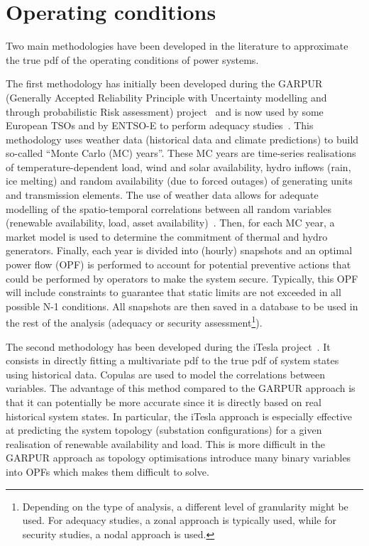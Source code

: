 \section{Operating conditions}
\label{sec:operating_conditions}

Two main methodologies have been developed in the literature to approximate the true pdf of the operating conditions of power systems.

The first methodology has initially been developed during the GARPUR (Generally Accepted Reliability Principle with Uncertainty modelling and through probabilistic Risk assessment) project~\cite{StrathElia, StrathGARPUR} and is now used by some European TSOs and by ENTSO-E to perform adequacy studies~\cite{ACER_MC_year, EliaAdequacy, ENTSOE_MC_year}. This methodology uses weather data (historical data and climate predictions) to build so-called ``Monte Carlo (MC) years''. These MC years are time-series realisations of temperature-dependent load, wind and solar availability, hydro inflows (rain, ice melting) and random availability (due to forced outages) of generating units and transmission elements. The use of weather data allows for adequate modelling of the spatio-temporal correlations between all random variables (renewable availability, load, asset availability)~\cite{StrathGARPUR, ENTSOE_MC_year}. Then, for each MC year, a market model is used to determine the commitment of thermal and hydro generators. Finally, each year is divided into (\eg hourly) snapshots and an optimal power flow (OPF) is performed to account for potential preventive actions that could be performed by operators to make the system secure. Typically, this OPF will include constraints to guarantee that static limits are not exceeded in all possible N-1 conditions. All snapshots are then saved in a database to be used in the rest of the analysis (\eg adequacy or security assessment\footnote{Depending on the type of analysis, a different level of granularity might be used. For adequacy studies, a zonal approach is typically used, while for security studies, a nodal approach is used.}).


The second methodology has been developed during the iTesla project~\cite{KonstantelosCopulas, EurostagHPC, iTesla_uncertainties}. It consists in directly fitting a multivariate pdf to the true pdf of system states using historical data. Copulas are used to model the correlations between variables. The advantage of this method compared to the GARPUR approach is that it can potentially be more accurate since it is directly based on real historical system states. In particular, the iTesla approach is especially effective at predicting the system topology (\ie substation configurations) for a given realisation of renewable availability and load. This is more difficult in the GARPUR approach as topology optimisations introduce many binary variables into OPFs which makes them difficult to solve.

